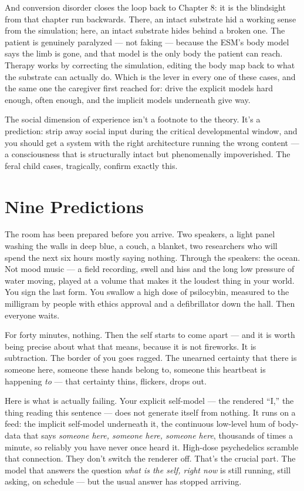 \documentclass[11pt, twoside, openright]{book}
\begin{document}
And conversion disorder closes the loop back to Chapter 8: it is the blindsight from that chapter run backwards. There, an intact substrate hid a working sense from the simulation; here, an intact substrate hides behind a broken one. The patient is genuinely paralyzed --- not faking --- because the ESM's body model says the limb is gone, and that model is the only body the patient can reach. Therapy works by correcting the simulation, editing the body map back to what the substrate can actually do. Which is the lever in every one of these cases, and the same one the caregiver first reached for: drive the explicit models hard enough, often enough, and the implicit models underneath give way.

The social dimension of experience isn't a footnote to the theory. It's a prediction: strip away social input during the critical developmental window, and you should get a system with the right architecture running the wrong content --- a consciousness that is structurally intact but phenomenally impoverished. The feral child cases, tragically, confirm exactly this.


\chapter{Nine Predictions}

The room has been prepared before you arrive. Two speakers, a light panel washing the walls in deep blue, a couch, a blanket, two researchers who will spend the next six hours mostly saying nothing. Through the speakers: the ocean. Not mood music --- a field recording, swell and hiss and the long low pressure of water moving, played at a volume that makes it the loudest thing in your world. You sign the last form. You swallow a high dose of psilocybin, measured to the milligram by people with ethics approval and a defibrillator down the hall. Then everyone waits.

For forty minutes, nothing. Then the self starts to come apart --- and it is worth being precise about what that means, because it is not fireworks. It is subtraction. The border of you goes ragged. The unearned certainty that there is someone here, someone these hands belong to, someone this heartbeat is happening \textit{to} --- that certainty thins, flickers, drops out.

Here is what is actually failing. Your explicit self-model --- the rendered ``I,'' the thing reading this sentence --- does not generate itself from nothing. It runs on a feed: the implicit self-model underneath it, the continuous low-level hum of body-data that says \textit{someone here, someone here, someone here}, thousands of times a minute, so reliably you have never once heard it. High-dose psychedelics scramble that connection. They don't switch the renderer off. That's the crucial part. The model that answers the question \textit{what is the self, right now} is still running, still asking, on schedule --- but the usual answer has stopped arriving.
\end{document}
